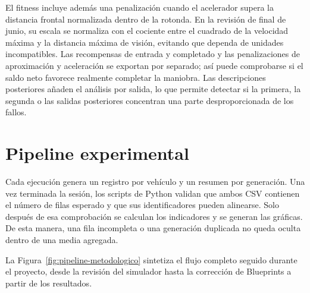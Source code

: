 El fitness incluye además una penalización cuando el acelerador supera la distancia frontal normalizada dentro de la rotonda. En la revisión de final de junio, su escala se normaliza con el cociente entre el cuadrado de la velocidad máxima y la distancia máxima de visión, evitando que dependa de unidades incompatibles. Las recompensas de entrada y completado y las penalizaciones de aproximación y aceleración se exportan por separado; así puede comprobarse si el saldo neto favorece realmente completar la maniobra. Las descripciones posteriores añaden el análisis por salida, lo que permite detectar si la primera, la segunda o las salidas posteriores concentran una parte desproporcionada de los fallos.

\section{Pipeline experimental}
\enlargethispage{\baselineskip}

Cada ejecución genera un registro por vehículo y un resumen por generación. Una vez terminada la sesión, los scripts de Python validan que ambos CSV contienen el número de filas esperado y que sus identificadores pueden alinearse. Solo después de esa comprobación se calculan los indicadores y se generan las gráficas. De esta manera, una fila incompleta o una generación duplicada no queda oculta dentro de una media agregada.

La Figura~\ref{fig:pipeline-metodologico} sintetiza el flujo completo seguido durante el proyecto, desde la revisión del simulador hasta la corrección de Blueprints a partir de los resultados.

